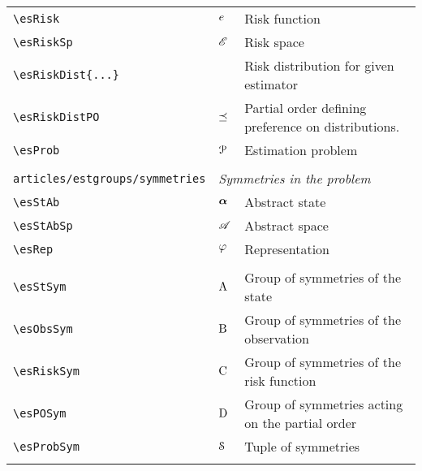 \begin{longtable}{lll}
 {\color[rgb]{0.5,0.5,0.5}\texttt{\textbackslash esRisk}} & $e$ &  Risk function\\ 
 {\color[rgb]{0.5,0.5,0.5}\texttt{\textbackslash esRiskSp}} & $\mathscr{E}$ &  Risk space\\ 
 {\color[rgb]{0.5,0.5,0.5}\texttt{\textbackslash esRiskDist\{...\}}} &  &  Risk distribution for given estimator\\ 
 {\color[rgb]{0.5,0.5,0.5}\texttt{\textbackslash esRiskDistPO}} & $\preceq$ &  Partial order defining preference on distributions.\\ 
 {\color[rgb]{0.5,0.5,0.5}\texttt{\textbackslash esProb}} & $\mathcal{P}$ &  Estimation problem\\ 
  &  & \\ 
 {\color[rgb]{0.5,0.5,0.5}\texttt{articles/estgroups/symmetries}} & \multicolumn{2}{l}{\emph{Symmetries in the problem}}\\ 
 \hline
{\color[rgb]{0.5,0.5,0.5}\texttt{\textbackslash esStAb}} & $\boldsymbol{\alpha}$ &  Abstract state\\ 
 {\color[rgb]{0.5,0.5,0.5}\texttt{\textbackslash esStAbSp}} & $\mathscr{A}$ &  Abstract space\\ 
 {\color[rgb]{0.5,0.5,0.5}\texttt{\textbackslash esRep}} & $\varphi$ &  Representation\\ 
  &  & {\setlength\fboxsep{1pt}%
\fbox{%
\color[rgb]{0.5,0.5,0.5}\begin{minipage}[]{8cm}%
$\esRep: \esSt \mapsto \esStAb$.\par%
{\small{\texttt{\$\textbackslash esRep: \textbackslash esSt \textbackslash mapsto \textbackslash esStAb\$.}}}\end{minipage}%
}%
}%
\\ 
 {\color[rgb]{0.5,0.5,0.5}\texttt{\textbackslash esStSym}} & $\mathrm{A}$ &  Group of symmetries of the state\\ 
 {\color[rgb]{0.5,0.5,0.5}\texttt{\textbackslash esObsSym}} & $\mathrm{B}$ &  Group of symmetries of the observation\\ 
 {\color[rgb]{0.5,0.5,0.5}\texttt{\textbackslash esRiskSym}} & $\mathrm{C}$ &  Group of symmetries of the risk function\\ 
 {\color[rgb]{0.5,0.5,0.5}\texttt{\textbackslash esPOSym}} & $\mathrm{D}$ &  Group of symmetries acting on the partial order\\ 
 {\color[rgb]{0.5,0.5,0.5}\texttt{\textbackslash esProbSym}} & $\mathcal{S}$ &  Tuple of symmetries\\ 
  &  & \\ 

\end{longtable}
